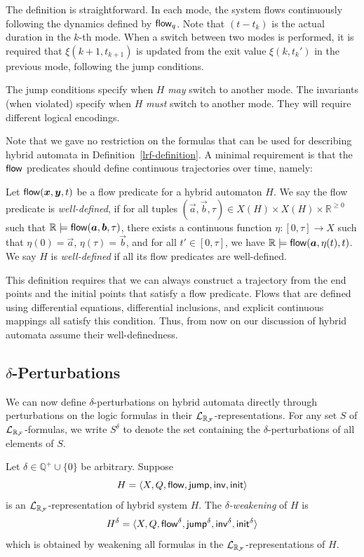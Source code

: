 \documentclass[12pt]{llncs}
\begin{document}
The definition is straightforward. In each mode, the system flows continuously following the dynamics defined by $\mathsf{flow}_q$. Note that $(t-t_k)$ is the actual duration in the $k$-th mode. When a switch between two modes is performed, it is required that $\xi(k+1, t_{k+1})$ is updated from the exit value $\xi(k, t_k')$ in the previous mode, following the jump conditions.
\begin{remark} The jump conditions specify when $H$ {\em may}  switch to another mode. The invariants (when violated) specify when $H$ {\em must} switch to another mode. They will require different logical encodings.
\end{remark}
Note that we gave no restriction on the formulas that can be used for describing hybrid automata in Definition~\ref{lrf-definition}. A minimal requirement is that the $\mathsf{flow}$ predicates should define continuous trajectories over time, namely:
\begin{definition}
Let $\flow(\vec x, \vec y, t)$ be a flow predicate for a hybrid automaton $H$. We say the flow predicate is {\em well-defined}, if for all tuples $(\vec a,\vec b, \tau)\in X(H)\times X(H)\times \mathbb{R}^{\geq 0}$ such that $\mathbb{R}\models\flow(\vec a,\vec b, \tau)$, there exists a continuous function $\eta:[0,\tau]\rightarrow X$ such that $\eta(0) = \vec a$, $\eta(\tau) = \vec b$, and for all $t'\in [0,\tau]$, we have $\mathbb{R}\models\flow(\vec a, \eta(t), t)$. We say $H$ is {\em well-defined} if all its flow predicates are well-defined.
\end{definition}
This definition requires that we can always construct a trajectory from the end points and the initial points that satisfy a flow predicate. Flows that are defined using differential equations, differential inclusions, and explicit continuous mappings all satisfy this condition. Thus, from now on our discussion of hybrid automata assume their well-definedness.
\subsection{$\delta$-Perturbations}
We can now define $\delta$-perturbations on hybrid automata directly through perturbations on the logic formulas in their $\mathcal{L}_{\mathbb{R}_{\mathcal{F}}}$-representations. For any set $S$ of $\mathcal{L}_{\mathbb{R}_{\mathcal{F}}}$-formulas, we write $S^{\delta}$ to denote the set containing the $\delta$-perturbations of all elements of $S$.
\begin{definition} Let $\delta\in\mathbb{Q}^+\cup\{0\}$ be arbitrary. Suppose
$$H = \langle X, Q, \mathsf{flow}, \mathsf{jump}, \mathsf{inv}, \mathsf{init}\rangle$$
is an $\mathcal{L}_{\mathbb{R}_{\mathcal{F}}}$-representation of hybrid system $H$. The {\em $\delta$-weakening} of $H$ is
$$H^{\delta} = \langle X, Q, \mathsf{flow}^{\delta}, \mathsf{jump}^{\delta}, \mathsf{inv}^{\delta}, \mathsf{init}^{\delta}\rangle$$
which is obtained by weakening all formulas in the $\mathcal{L}_{\mathbb{R}_{\mathcal{F}}}$-representations of $H$.
\end{definition}
\end{document}
